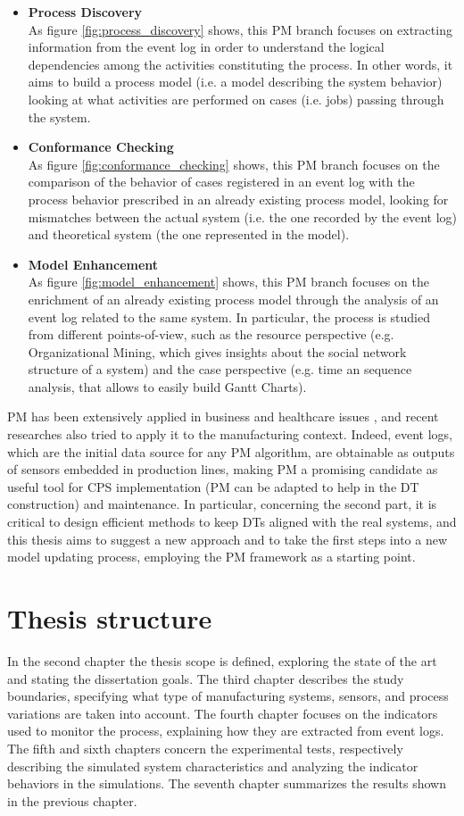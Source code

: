 \begin{itemize}
\item \textbf{Process Discovery}\\As figure \ref{fig:process_discovery} shows, this PM branch focuses on extracting information from the event log in order to understand the logical dependencies among the activities constituting the process. In other words, it aims to build a process model (i.e. a model describing the system behavior) looking at what activities are performed on cases (i.e. jobs) passing through the system.
\item \textbf{Conformance Checking}\\As figure \ref{fig:conformance_checking} shows, this PM branch focuses on the comparison of the behavior of cases registered in an event log with the process behavior prescribed in an already existing process model, looking for mismatches between the actual system (i.e. the one recorded by the event log) and theoretical system (the one represented in the model).
\item \textbf{Model Enhancement}\\As figure \ref{fig:model_enhancement} shows, this PM branch focuses on the enrichment of an already existing process model through the analysis of an event log related to the same system. In particular, the process is studied from different points-of-view, such as the resource perspective (e.g. Organizational Mining, which gives insights about the social network structure of a system) and the case perspective (e.g. time an sequence analysis, that allows to easily build Gantt Charts). 
\end{itemize}
PM has been extensively applied in business and healthcare issues \cite{RojasEric2016Pmih}, and recent researches also tried to apply it to the manufacturing context. Indeed, event logs, which are the initial data source for any PM algorithm, are obtainable as outputs of sensors embedded in production lines, making PM a promising candidate as useful tool for CPS implementation (PM can be adapted to help in the DT construction) and maintenance. In particular, concerning the second part, it is critical to design efficient methods to keep DTs aligned with the real systems, and this thesis aims to suggest a new approach and to take the first steps into a new model updating process, employing the PM framework as a starting point. 
\section{Thesis structure}
In the second chapter the thesis scope is defined, exploring the state of the art and stating the dissertation goals. The third chapter describes the study boundaries, specifying what type of manufacturing systems, sensors, and process variations are taken into account. The fourth chapter focuses on the indicators used to monitor the process, explaining how they are extracted from event logs. The fifth and sixth chapters concern the experimental tests, respectively describing the simulated system characteristics and analyzing the indicator behaviors in the simulations. The seventh chapter summarizes the results shown in the previous chapter. 